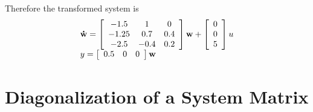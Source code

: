 Therefore the transformed system is
\[
\begin{array}{l}
 {\bf{\dot w}} = \left[ {\begin{array}{*{20}c}
   { - 1.5} & 1 & 0  \\
   { - 1.25} & {0.7} & {0.4}  \\
   { - 2.5} & { - 0.4} & {0.2}  \\
\end{array}} \right]{\bf{w}} + \left[ {\begin{array}{*{20}c}
   0  \\
   0  \\
   5  \\
\end{array}} \right]u \\ 
 y = \left[ {\begin{array}{*{20}c}
   {0.5} & 0 & 0  \\
\end{array}} \right]{\bf{w}} \\ 
 \end{array}
\]


 
\section*{Diagonalization of a System Matrix} %
\label{sec:diagonalization_of_a_system_matrix}

